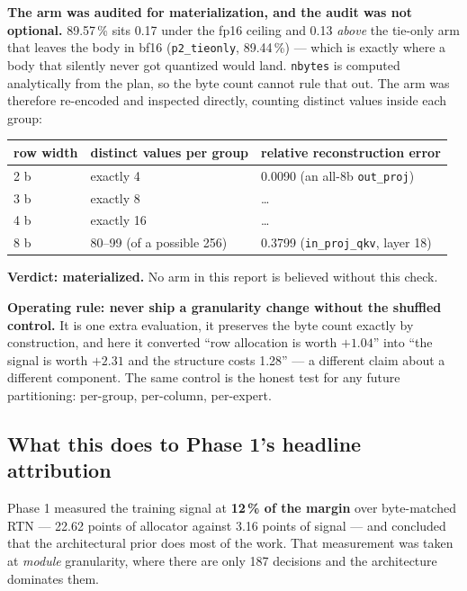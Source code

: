 \documentclass[11pt]{article}
\newcommand{\pct}{\,\%}
\newcommand{\code}[1]{\texttt{#1}}
\newenvironment{aside}%
{\par\needspace{4\baselineskip}\vspace{0.8ex}%
\begin{lrbox}{\asidebox}\begin{minipage}{\dimexpr\textwidth-18pt\relax}\small}%
{\end{minipage}\end{lrbox}%
\noindent\setlength{\fboxsep}{9pt}\colorbox{warnbg}{\usebox{\asidebox}}%
\vspace{0.6ex}\par}
\begin{document}
\textbf{The arm was audited for materialization, and the audit was not optional.} 89.57\pct{} sits
0.17 under the fp16 ceiling and 0.13 \emph{above} the tie-only arm that leaves the body in bf16
(\code{p2\_tieonly}, 89.44\pct) --- which is exactly where a body that silently never got quantized
would land. \code{nbytes} is computed analytically from the plan, so the byte count cannot rule
that out. The arm was therefore re-encoded and inspected directly, counting distinct values inside
each group:

\begin{center}\small
\begin{tabular}{@{}lll@{}}
\toprule
row width & distinct values per group & relative reconstruction error \\
\midrule
2 b & exactly 4 & 0.0090 (an all-8b \code{out\_proj}) \\
3 b & exactly 8 & \quad \dots \\
4 b & exactly 16 & \quad \dots \\
8 b & 80--99 (of a possible 256) & 0.3799 (\code{in\_proj\_qkv}, layer 18) \\
\bottomrule
\end{tabular}
\end{center}

\textbf{Verdict: materialized.} No arm in this report is believed without this check.

\begin{aside}
\textbf{Operating rule: never ship a granularity change without the shuffled control.} It is one
extra evaluation, it preserves the byte count exactly by construction, and here it converted ``row
allocation is worth $+1.04$'' into ``the signal is worth $+2.31$ and the structure costs 1.28'' ---
a different claim about a different component. The same control is the honest test for any future
partitioning: per-group, per-column, per-expert.
\end{aside}

\subsection{What this does to Phase 1's headline attribution}

Phase 1 measured the training signal at \textbf{12\pct{} of the margin} over byte-matched RTN ---
22.62 points of allocator against 3.16 points of signal --- and concluded that the architectural
prior does most of the work. That measurement was taken at \emph{module} granularity, where there
are only 187 decisions and the architecture dominates them.
\end{document}
